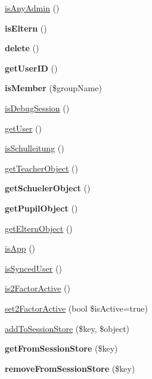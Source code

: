 \begin{DoxyCompactItemize}
\mbox{\hyperlink{classsession_ad73cba9f4035a4a56fd9408cc3deee40}{is\+Any\+Admin}} ()
\item 
\mbox{\label{classsession_a503c7f0b3665142e4d7a62c47d6d2679}} 
{\bfseries is\+Eltern} ()
\item 
\mbox{\label{classsession_aa4fe3100f41e457b64553769c4b72fe6}} 
{\bfseries delete} ()
\item 
\mbox{\label{classsession_ab98710a2e4265ddfd12f4c2d7e9e03b6}} 
{\bfseries get\+User\+ID} ()
\item 
\mbox{\label{classsession_a4e1831080836c91b1938a97bf542a435}} 
{\bfseries is\+Member} (\$group\+Name)
\item 
\mbox{\hyperlink{classsession_a1cd5fba2d2ab09f11b686b6bfb77d38f}{is\+Debug\+Session}} ()
\item 
\mbox{\hyperlink{classsession_a57dc997b9bbd925538bb15cc5fa2b0a8}{get\+User}} ()
\item 
\mbox{\hyperlink{classsession_a1e5cf401d45d01cc32e1eeb2aae6ef8e}{is\+Schulleitung}} ()
\item 
\mbox{\hyperlink{classsession_ad84474cda1ebf612eccfdd1c8a28c819}{get\+Teacher\+Object}} ()
\item 
\mbox{\label{classsession_a6e88144ea94c469aeb693a2d8c5c9454}} 
{\bfseries get\+Schueler\+Object} ()
\item 
\mbox{\label{classsession_a0505d3dcd8770043561d4e78590b8b27}} 
{\bfseries get\+Pupil\+Object} ()
\item 
\mbox{\hyperlink{classsession_a8ff97ada188e93452e97bb8a2cb1aa30}{get\+Eltern\+Object}} ()
\item 
\mbox{\hyperlink{classsession_ae411fc8f5203114bec3e5ec1db754d56}{is\+App}} ()
\item 
\mbox{\hyperlink{classsession_aa72d6eb0d49822e9836f8084f5b4dcd8}{is\+Synced\+User}} ()
\item 
\mbox{\hyperlink{classsession_a2c8aa6e6d677a289c41027af02154098}{is2\+Factor\+Active}} ()
\item 
\mbox{\hyperlink{classsession_ab37f77b882b53f87e456ab99dcffe15c}{set2\+Factor\+Active}} (bool \$is\+Active=true)
\item 
\mbox{\hyperlink{classsession_a0fe6fe88519aeb76fd5655f03c186edf}{add\+To\+Session\+Store}} (\$key, \$object)
\item 
\mbox{\label{classsession_a179deaf60ac6f39d016c3fa660ff3892}} 
{\bfseries get\+From\+Session\+Store} (\$key)
\item 
\mbox{\label{classsession_ae5f132dfa1fb4c182f14284b7822c788}} 
{\bfseries remove\+From\+Session\+Store} (\$key)
\end{DoxyCompactItemize}
